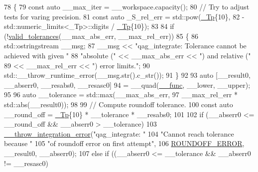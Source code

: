 \begin{DoxyCode}
78     \{
79       \textcolor{keyword}{const} \textcolor{keyword}{auto} \_\_max\_iter = \_\_workspace.capacity();
80       \textcolor{comment}{// Try to adjust tests for varing precision.}
81       \textcolor{keyword}{const} \textcolor{keyword}{auto} \_S\_rel\_err = std::pow(\hyperlink{namespace____gnu__cxx_a3b19a9c800ca194374ef9172290f7d79}{\_Tp}\{10\},
82                                  -std::numeric\_limits<\_Tp>::digits / \hyperlink{namespace____gnu__cxx_a3b19a9c800ca194374ef9172290f7d79}{\_Tp}\{10\});
83 
84       \textcolor{keywordflow}{if} (!\hyperlink{namespace____gnu__cxx_a86b1d89b2e2cb97614fdf3425d3dccd5}{valid\_tolerances}(\_\_max\_abs\_err, \_\_max\_rel\_err))
85         \{
86           std::ostringstream \_\_msg;
87           \_\_msg << \textcolor{stringliteral}{"qag\_integrate: Tolerance cannot be achieved with given "}
88                    \textcolor{stringliteral}{"absolute ("} << \_\_max\_abs\_err << \textcolor{stringliteral}{") and relative ("}
89                 << \_\_max\_rel\_err << \textcolor{stringliteral}{") error limits."};
90           std::\_\_throw\_runtime\_error(\_\_msg.str().c\_str());
91         \}
92 
93       \textcolor{keyword}{auto} [\_\_result0, \_\_abserr0, \_\_resabs0, \_\_resasc0]
94         = \_\_quad(\hyperlink{namespace____gnu__cxx_af2b2f0c7a2ae72b922b1afefae5a65b2}{\_\_func}, \_\_lower, \_\_upper);
95 
96       \textcolor{keyword}{auto} \_\_tolerance = std::max(\_\_max\_abs\_err,
97                                   \_\_max\_rel\_err * std::abs(\_\_result0));
98 
99       \textcolor{comment}{// Compute roundoff tolerance.}
100       \textcolor{keyword}{const} \textcolor{keyword}{auto} \_\_round\_off = \hyperlink{namespace____gnu__cxx_a3b19a9c800ca194374ef9172290f7d79}{\_Tp}\{10\} * \_\_tolerance * \_\_resabs0;
101 
102       \textcolor{keywordflow}{if} (\_\_abserr0 <= \_\_round\_off && \_\_abserr0 > \_\_tolerance)
103         \hyperlink{namespace____gnu__cxx_a2ae22137ca092b8ae10f4d42b4e32cfb}{\_\_throw\_integration\_error}(\textcolor{stringliteral}{"qag\_integrate: "}
104                                   \textcolor{stringliteral}{"Cannot reach tolerance because "}
105                                   \textcolor{stringliteral}{"of roundoff error on first attempt"},
106                                   \hyperlink{namespace____gnu__cxx_ad6c62dd86a596716cece6ac2d4cfd4b3a29574de87143c7715e9a138d7340e8ae}{ROUNDOFF\_ERROR}, \_\_result0, \_\_abserr0);
107       \textcolor{keywordflow}{else} \textcolor{keywordflow}{if} ((\_\_abserr0 <= \_\_tolerance && \_\_abserr0 != \_\_resasc0)

\end{DoxyCode}
